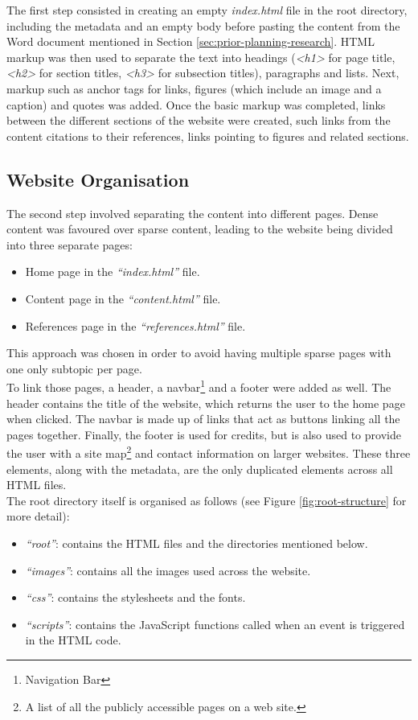 \documentclass[letterpaper,12pt]{article}
\begin{document}
The first step consisted in creating an empty \textit{index.html} file in the root directory, including the metadata and an empty body before pasting the content from the Word document mentioned in Section \ref{sec:prior-planning-research}. HTML markup was then used to separate the text into headings (\textit{\textless h1\textgreater} for page title, \textit{\textless h2\textgreater} for section titles, \textit{\textless h3\textgreater} for subsection titles), paragraphs and lists. Next, markup such as anchor tags for links, figures (which include an image and a caption) and quotes was added. Once the basic markup was completed, links between the different sections of the website were created, such links from the content citations to their references, links pointing to figures and related sections.

\subsection{Website Organisation}

The second step involved separating the content into different pages. Dense content was favoured over sparse content, leading to the website being divided into three separate pages:
\begin{itemize}
    \item Home page in the \textit{``index.html''} file.
    \item Content page in the \textit{``content.html''} file.
    \item References page in the \textit{``references.html''} file.
\end{itemize}
This approach was chosen in order to avoid having multiple sparse pages with one only subtopic per page.\\

To link those pages, a header, a navbar\footnote{Navigation Bar} and a footer were added as well. The header contains the title of the website, which returns the user to the home page when clicked. The navbar is made up of links that act as buttons linking all the pages together. Finally, the footer is used for credits, but is also used to provide the user with a site map\footnote{A list of all the publicly accessible pages on a web site.} and contact information on larger websites. These three elements, along with the metadata, are the only duplicated elements across all HTML files.\\

The root directory itself is organised as follows (see Figure \ref{fig:root-structure} for more detail):
\begin{itemize}
    \item \textit{``root''}: contains the HTML files and the directories mentioned below.
    \item \textit{``images''}: contains all the images used across the website.
    \item \textit{``css''}: contains the stylesheets and the fonts.
    \item \textit{``scripts''}: contains the JavaScript functions called when an event is triggered in the HTML code.
\end{itemize}
\end{document}
